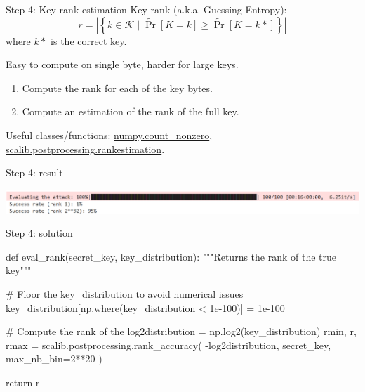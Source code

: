 \documentclass[aspectratio=169]{beamer}
\begin{document}
\begin{frame}{Step 4: Key rank estimation}
    Key rank (a.k.a. Guessing Entropy):
    \[
        r = \left\vert\left\{
            k \in \mathcal{K} \;|\; \tilde{\Pr}[K=k] \ge \tilde{\Pr}[K=k*]
            \right\}\right\vert
    \]
    where $k*$ is the correct key.

    Easy to compute on single byte, harder for large keys.

    \begin{enumerate}
        \item Compute the rank for each of the key bytes.
        \item Compute an estimation of the rank of the full key.
    \end{enumerate}

    Useful classes/functions:
    \href{https://numpy.org/doc/stable/reference/generated/numpy.count_nonzero.html}{numpy.count\_nonzero},
    \href{https://scalib.readthedocs.io/en/stable/source/api/scalib.postprocessing.rankestimation.html}{scalib.postprocessing.rankestimation}.
\end{frame}
\begin{frame}{Step 4: result}
    \begin{center}
        \includegraphics[width=\textwidth]{figures/res_step4.png}
    \end{center}
\end{frame}

\begin{frame}[containsverbatim]{Step 4: solution}
\begin{python}
def eval_rank(secret_key, key_distribution):
    """Returns the rank of the true key"""

    # Floor the key_distribution to avoid numerical issues
    key_distribution[np.where(key_distribution < 1e-100)] = 1e-100

    # Compute the rank of the
    log2distribution = np.log2(key_distribution)
    rmin, r, rmax = scalib.postprocessing.rank_accuracy(
        -log2distribution, secret_key, max_nb_bin=2**20
    )

    return r

\end{python}
\end{frame}
\end{document}
